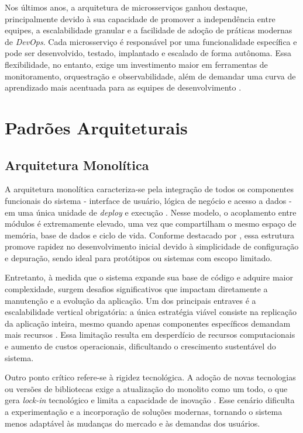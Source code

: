 Nos últimos anos, a arquitetura de microsserviços ganhou destaque, principalmente devido à sua capacidade de promover a independência entre equipes, a escalabilidade granular e a facilidade de adoção de práticas modernas de \textit{DevOps}. Cada microsserviço é responsável por uma funcionalidade específica e pode ser desenvolvido, testado, implantado e escalado de forma autônoma. Essa flexibilidade, no entanto, exige um investimento maior em ferramentas de monitoramento, orquestração e observabilidade, além de demandar uma curva de aprendizado mais acentuada para as equipes de desenvolvimento \cite{jamshidi2016systematic, shekhar2023microservices, nizami2020comparison}. 

\section{Padrões Arquiteturais}

\subsection{Arquitetura Monolítica}

A arquitetura monolítica caracteriza-se pela integração de todos os componentes funcionais do sistema - interface de usuário, lógica de negócio e acesso a dados - em uma única unidade de \textit{deploy} e execução \cite{nizami2020comparison}. Nesse modelo, o acoplamento entre módulos é extremamente elevado, uma vez que compartilham o mesmo espaço de memória, base de dados e ciclo de vida. Conforme destacado por \cite{farhan2023performance}, essa estrutura promove rapidez no desenvolvimento inicial devido à simplicidade de configuração e depuração, sendo ideal para protótipos ou sistemas com escopo limitado.

Entretanto, à medida que o sistema expande sua base de código e adquire maior complexidade, surgem desafios significativos que impactam diretamente a manutenção e a evolução da aplicação. Um dos principais entraves é a escalabilidade vertical obrigatória: a única estratégia viável consiste na replicação da aplicação inteira, mesmo quando apenas componentes específicos demandam mais recursos \cite{nizami2020comparison}. Essa limitação resulta em desperdício de recursos computacionais e aumento de custos operacionais, dificultando o crescimento sustentável do sistema.

Outro ponto crítico refere-se à rigidez tecnológica. A adoção de novas tecnologias ou versões de bibliotecas exige a atualização do monolito como um todo, o que gera \textit{lock-in} tecnológico e limita a capacidade de inovação \cite{jamshidi2016systematic}. Esse cenário dificulta a experimentação e a incorporação de soluções modernas, tornando o sistema menos adaptável às mudanças do mercado e às demandas dos usuários.

